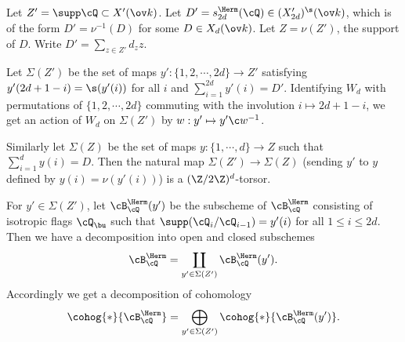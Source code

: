 Let $Z'=\supp\cQ\subset X'(\ov k)$.  Let $D'=s^{\Herm}_{2d}(\cQ)\in (X'_{2d})^{\s}(\ov k)$, which is of the form $D'=\nu^{-1}(D)$ for some $D\in X_{d}(\ov k)$. Let $Z=\nu(Z')$, the support of $D$. Write $D'=\sum_{z\in Z'}d_{z}z$.

Let $\Sigma(Z')$ be the set of maps $y': \{1,2,\cdots,2d\}\to Z'$ satisfying $y'(2d+1-i)=\s(y'(i))$ for all $i$ and $\sum_{i=1}^{2d}y'(i)=D'$. Identifying $W_{d}$ with permutations of $\{1,2,\cdots,2d\}$ commuting with the involution $i\mapsto 2d+1-i$, we get an action of $W_{d}$ on $\Sigma(Z')$ by $w: y'\mapsto y'\c w^{-1}$.

Similarly let $\Sigma(Z)$ be the set of maps $y:\{1,\cdots, d\}\to Z$ such that $\sum_{i=1}^{d}y(i)=D$. Then the natural map $\Sigma(Z')\to \Sigma(Z)$ (sending $y'$ to $y$ defined by $y(i)=\nu(y'(i))$) is a $(\Z/2\Z)^{d}$-torsor.

For $y'\in\Sigma(Z')$, let $\cB^{\Herm}_{\cQ}(y')$ be the subscheme of $\cB^{\Herm}_{\cQ}$ consisting of isotropic flags $\cQ_{\bu}$ such that $\supp(\cQ_{i}/\cQ_{i-1})=y'(i)$ for all $1\le i\le 2d$. Then we have a decomposition into open and closed subschemes
\begin{equation*}
\cB^{\Herm}_{\cQ}=\coprod_{y'\in \Sigma(Z')}\cB^{\Herm}_{\cQ}(y').
\end{equation*}
Accordingly we get a decomposition of cohomology
\begin{equation*}
\cohog{*}{\cB^{\Herm}_{\cQ}}=\bigoplus_{y'\in \Sigma(Z')}\cohog{*}{\cB^{\Herm}_{\cQ}(y')}.
\end{equation*}



